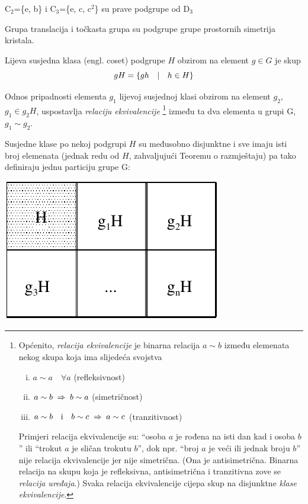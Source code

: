 \begin{primjer}
C$_2$=\{e, b\} i C$_3$=\{e, c, c$^2$\} su prave podgrupe od D$_3$
\end{primjer}

\begin{primjer}
Grupa translacija i točkasta grupa su podgrupe grupe prostornih
simetrija kristala.
\end{primjer}

\begin{definicija}
Lijeva susjedna klasa (engl. coset) podgrupe $H$ obzirom na element
$g\in G$ je skup
\begin{displaymath}
     gH=\{gh \quad | \quad h\in H\}
\end{displaymath}
\end{definicija}

Odnos pripadnosti elementa $g_1$ lijevoj susjednoj klasi obzirom na element $g_2$,  
$g_1 \in g_2 H$, uspostavlja \emph{relaciju ekvivalencije}%
\footnote{Općenito, \emph{relacija ekvivalencije} je binarna relacija $a\sim b$ između
elemenata nekog
skupa koja ima slijedeća svojstva
\begin{enumerate}[(i)]
\item $a\sim a \quad \forall a$ \qquad (refleksivnost)
\item $a\sim b \;\Rightarrow\; b\sim a$   \qquad (simetričnost)
\item $a\sim b \quad \textrm{i}\quad  b\sim c \;\Rightarrow\; a\sim c$  \qquad (tranzitivnost)
\end{enumerate}
Primjeri relacija ekvivalencije su: ``osoba $a$ je rođena na isti dan kad i osoba $b$''
ili ``trokut $a$ je sličan trokutu $b$'', dok npr. ``broj $a$ je veći ili jednak
broju $b$'' nije relacija ekvivalencije jer nije simetrična.
(Ona je antisimetrična. Binarna relacija na skupu koja je refleksivna, antisimetrična
i tranzitivna zove se \emph{relacija uređaja}.)
Svaka relacija ekvivalencije cijepa skup na disjunktne \emph{klase ekvivalencije}.
} između ta dva elementa u grupi G, $g_1 \sim g_2$.

Susjedne klase po nekoj podgrupi $H$ su međusobno disjunktne i
sve imaju isti broj elemenata (jednak redu od $H$, zahvaljujući
Teoremu o razmještaju) pa tako
definiraju jednu particiju grupe G:

\centerline{\includegraphics[scale=1.0]{pics/lagrange}}


